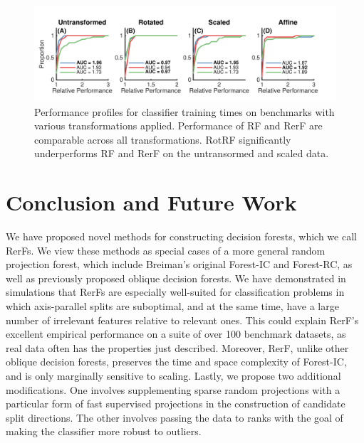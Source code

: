 \documentclass{article}
\begin{document}
\begin{figure}[ht]
\vskip 0.2in
\begin{center}
\centerline{\includegraphics[width=\columnwidth]{../Figures/pdf/Fig6_benchmark_time}}
\caption{Performance profiles for classifier training times on benchmarks with various transformations applied. Performance of RF and RerF are comparable across all transformations. RotRF significantly underperforms RF and RerF on the untransormed and scaled data.}
\label{time}
\end{center}
\vskip -0.2in
\end{figure}

\section{Conclusion and Future Work}

We have proposed novel methods for constructing decision forests, which we call RerFs. We view these methods as special cases of a more general random projection forest, which include Breiman's original Forest-IC and Forest-RC, as well as previously proposed oblique decision forests. We have demonstrated in simulations that RerFs are especially well-suited for classification problems in which axis-parallel splits are suboptimal, and at the same time, have a large number of irrelevant features relative to relevant ones. This could explain RerF's excellent empirical performance on a suite of over 100 benchmark datasets, as real data often has the properties just described. Moreover, RerF, unlike other oblique decision forests, preserves the time and space complexity of Forest-IC, and is only marginally sensitive to scaling. Lastly, we propose two additional modifications. One involves supplementing sparse random projections with a particular form of fast supervised projections in the construction of candidate split directions. The other involves passing the data to ranks with the goal of making the classifier more robust to outliers.
\end{document}
